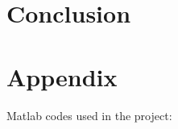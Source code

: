 \documentclass[a4paper, 11pt]{article}
\newcommand{\includecode}[1]{}
\begin{document}
\section{Conclusion}



%
%

\section{Appendix}
Matlab codes used in the project:
\end{document}
